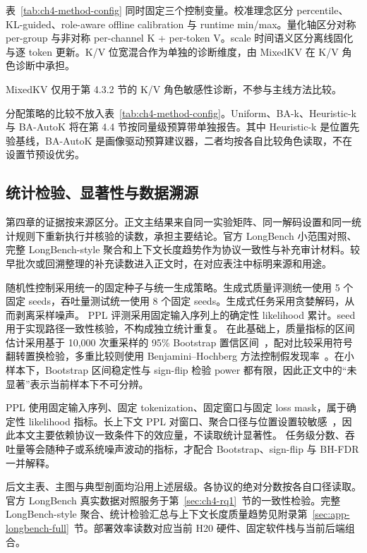 表~\ref{tab:ch4-method-config} 同时固定三个控制变量。校准理念区分 percentile、KL-guided、role-aware offline calibration 与 runtime min/max。量化轴区分对称 per-group 与非对称 per-channel K + per-token V。scale 时间语义区分离线固化与逐 token 更新。K/V 位宽混合作为单独的诊断维度，由 MixedKV 在 K/V 角色诊断中承担。

MixedKV 仅用于第 4.3.2 节的 K/V 角色敏感性诊断，不参与主线方法比较。

分配策略的比较不放入表~\ref{tab:ch4-method-config}。Uniform、BA-k、Heuristic-k 与 BA-AutoK 将在第 4.4 节按同量级预算带单独报告。其中 Heuristic-k 是位置先验基线，BA-AutoK 是画像驱动预算建议器，二者均按各自比较角色读取，不在设置节预设优劣。

\subsection{统计检验、显著性与数据溯源}
\label{subsec:ch4-statistics}
\label{subsec:exp-statistics}

第四章的证据按来源区分。正文主结果来自同一实验矩阵、同一解码设置和同一统计规则下重新执行并核验的读数，承担主要结论。官方 LongBench 小范围对照、完整 LongBench-style 聚合和上下文长度趋势作为协议一致性与补充审计材料。较早批次或回溯整理的补充读数进入正文时，在对应表注中标明来源和用途。

随机性控制采用统一的固定种子与统一生成策略。生成式质量评测统一使用 5 个固定 seeds，吞吐量测试统一使用 8 个固定 seeds。生成式任务采用贪婪解码，从而剥离采样噪声。
PPL 评测采用固定输入序列上的确定性 likelihood 累计。seed 用于实现路径一致性核验，不构成独立统计重复。
在此基础上，质量指标的区间估计采用基于 10{,}000 次重采样的 95\% Bootstrap 置信区间~\cite{efron1994introduction}，配对比较采用符号翻转置换检验，多重比较则使用 Benjamini--Hochberg 方法控制假发现率~\cite{benjamini1995controlling}。在小样本下，Bootstrap 区间稳定性与 sign-flip 检验 power 都有限，因此正文中的“未显著”表示当前样本下不可分辨。

PPL 使用固定输入序列、固定 tokenization、固定窗口与固定 loss mask，属于确定性 likelihood 指标。长上下文 PPL 对窗口、聚合口径与位置设置较敏感~\cite{fang2025longppl}，因此本文主要依赖协议一致条件下的效应量，不读取统计显著性。
任务级分数、吞吐量等会随种子或系统噪声波动的指标，才配合 Bootstrap、sign-flip 与 BH-FDR 一并解释。

后文主表、主图与典型剖面均沿用上述层级。各协议的绝对分数按各自口径读取。官方 LongBench 真实数据对照服务于第~\ref{sec:ch4-rq1}~节的一致性检验。完整 LongBench-style 聚合、统计检验汇总与上下文长度质量趋势见附录第~\ref{sec:app-longbench-full}~节。部署效率读数对应当前 H20 硬件、固定软件栈与当前后端组合。

